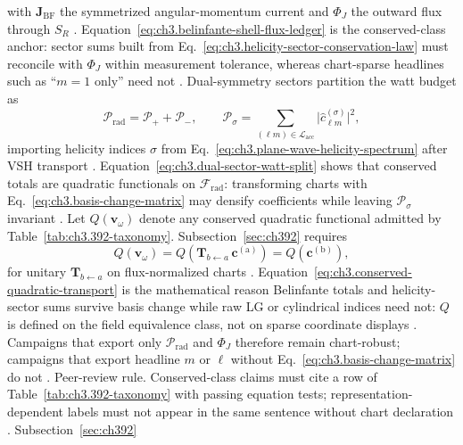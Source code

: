 with \(\mathbf{J}_{\mathrm{BF}}\) the symmetrized angular-momentum current and \(\Phi_{J}\) the outward flux through \(S_{R}\)
\cite{belinfante1940}. Equation~\eqref{eq:ch3.belinfante-shell-flux-ledger} is the conserved-class anchor: sector sums built
from Eq.~\eqref{eq:ch3.helicity-sector-conservation-law} must reconcile with \(\Phi_{J}\) within measurement tolerance, whereas chart-sparse headlines
such as ``\(m=1\) only'' need not \cite{harrington2001}. Dual-symmetry sectors partition the watt budget as
\begin{equation}
\label{eq:ch3.dual-sector-watt-split}
\mathcal{P}_{\mathrm{rad}}
=
\mathcal{P}_{+}+\mathcal{P}_{-},
\qquad
\mathcal{P}_{\sigma}
=
\sum_{(\ell m)\in\mathcal{L}_{\mathrm{acc}}}
\bigl|\widehat{c}_{\ell m}^{(\sigma)}\bigr|^{2},
\end{equation}
importing helicity indices \(\sigma\) from Eq.~\eqref{eq:ch3.plane-wave-helicity-spectrum} after VSH transport
\cite{belinfante1940}. Equation~\eqref{eq:ch3.dual-sector-watt-split} shows that conserved totals are quadratic functionals
on \(\mathcal{F}_{\mathrm{rad}}\): transforming charts with Eq.~\eqref{eq:ch3.basis-change-matrix} may densify coefficients while leaving
\(\mathcal{P}_{\sigma}\) invariant \cite{poynting1884}.
Let \(Q(\mathbf{v}_\omega)\) denote any conserved quadratic functional admitted by Table~\ref{tab:ch3.392-taxonomy}. Subsection~\ref{sec:ch392}
requires
\begin{equation}
\label{eq:ch3.conserved-quadratic-transport}
Q(\mathbf{v}_\omega)
=
Q\!\left(\mathbf{T}_{b\leftarrow a}\,\mathbf{c}^{(\mathrm{a})}\right)
=
Q\!\left(\mathbf{c}^{(\mathrm{b})}\right),
\end{equation}
for unitary \(\mathbf{T}_{b\leftarrow a}\) on flux-normalized charts \cite{hansen1988}. Equation~\eqref{eq:ch3.conserved-quadratic-transport}
is the mathematical reason Belinfante totals and helicity-sector sums survive basis change while raw LG or cylindrical indices need not:
\(Q\) is defined on the field equivalence class, not on sparse coordinate displays \cite{belinfante1940}. Campaigns that export only
\(\mathcal{P}_{\mathrm{rad}}\) and \(\Phi_{J}\) therefore remain chart-robust; campaigns that export headline \(m\) or \(\ell\) without
Eq.~\eqref{eq:ch3.basis-change-matrix} do not \cite{harrington2001}.
Peer-review rule. Conserved-class claims must cite a row of Table~\ref{tab:ch3.392-taxonomy} with passing equation tests; representation-dependent labels must
not appear in the same sentence without chart declaration \cite{belinfante1940}. Subsection~\ref{sec:ch392}
